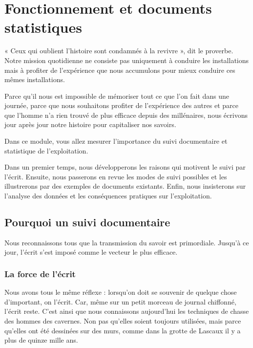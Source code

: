 \chapter{Fonctionnement et documents statistiques}


« Ceux qui oublient l’histoire sont condamnés à la revivre », dit le proverbe. Notre mission quotidienne ne consiste pas uniquement à conduire les installations mais à profiter de l’expérience que nous accumulons pour mieux conduire ces mêmes installations.
\vspace{0.3cm}

Parce qu’il nous est impossible de mémoriser tout ce que l’on fait dans une journée, parce que nous souhaitons profiter de l’expérience des autres et parce que l’homme n’a rien trouvé de plus efficace depuis des millénaires, nous écrivons jour après jour notre histoire pour capitaliser nos savoirs.
\vspace{0.3cm}

Dans ce module, vous allez mesurer l’importance du suivi documentaire et statistique de l’exploitation.
\vspace{0.3cm}

Dans un premier temps, nous développerons les raisons qui motivent le suivi par l’écrit. Ensuite, nous passerons en revue les modes de suivi possibles et les illustrerons par des exemples de documents existants. Enfin, nous insisterons sur l’analyse des données et les conséquences pratiques sur l’exploitation.




\section{Pourquoi un suivi documentaire}

Nous reconnaissons tous que la transmission du savoir est primordiale. Jusqu’à ce jour, l’écrit s’est imposé comme le vecteur le plus efficace.


\subsection{La force de l’écrit}

Nous avons tous le même réflexe : lorsqu’on doit se souvenir de quelque chose d’important, on l’écrit. Car, même sur un petit morceau de journal chiffonné, l’écrit reste. C’est ainsi que nous connaissons aujourd’hui les techniques de chasse des hommes des cavernes. Non pas qu’elles soient toujours utilisées, mais parce qu’elles ont été dessinées sur des murs, comme dans la grotte de Lascaux il y a plus de quinze mille ans. 


